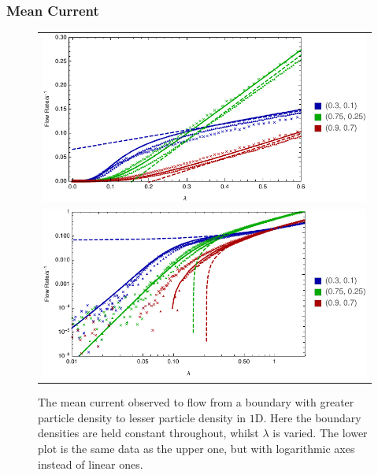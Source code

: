 \subsubsection{Mean Current}
\begin{figure} \caption[The current flowing through systems as we vary $\lambda$ with constant boundaries,
$1$D]{The mean current observed to flow from a boundary with greater particle density to lesser particle 
density in $1$D. Here the boundary densities are held constant throughout, whilst $\lambda$ is varied.
The lower plot is the same data as the upper one, but with logarithmic axes instead of linear ones.} 
\label{fig:1DlambdaScans}
\begin{center}
\begin{tabular}{c} 
\includegraphics[width=1.1\linewidth]{numerics/images/lambdaScan/allDataLinear} \\
\includegraphics[width=1.1\linewidth]{numerics/images/lambdaScan/allData} \\
\end{tabular}
\end{center}
\end{figure}

